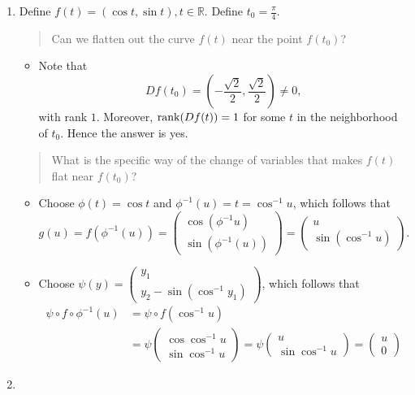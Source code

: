 \begin{example}
\begin{enumerate}
\item
Define $f(t)=(\cos t,\sin t), t\in\mathbb{R}$. Define $t_0=\frac{\pi}{4}$. 
\begin{quotation}
Can we flatten out the curve $f(t)$ near the point $f(t_0)$?
\end{quotation} 
\begin{itemize}
\item
Note that
\[
Df(t_0)=(-\frac{\sqrt{2}}{2},\frac{\sqrt{2}}{2})\ne0,
\]
with rank $1$. Moreover, $\operatorname{rank}(Df(t))=1$ for some $t$ in the neighborhood of $t_0$. Hence the answer is yes.
\end{itemize}
\begin{quotation}
What is the specific way of the change of variables that makes $f(t)$ flat near $f(t_0)$?
\end{quotation}
\begin{itemize}
\item
Choose $\phi(t)=\cos t$ and $\phi^{-1}(u)=t=\cos^{-1}u$, which follows that
\[
g(u)=f(\phi^{-1}(u))=\begin{pmatrix}
\cos(\phi^{-1}u)\\\sin(\phi^{-1}(u))
\end{pmatrix}
=\begin{pmatrix}
u\\
\sin(\cos^{-1}u)
\end{pmatrix}.
\]
\item
Choose $\psi(y)=\begin{pmatrix}
y_1\\y_2-\sin(\cos^{-1}y_1)
\end{pmatrix}$, which follows that
\begin{align*}
\psi\circ f\circ\phi^{-1}(u)
&=
\psi\circ f(\cos^{-1}u)\\
&=\psi\begin{pmatrix}
\cos\cos^{-1}u
\\
\sin\cos^{-1}u
\end{pmatrix}=
\psi\begin{pmatrix}
u
\\
\sin\cos^{-1}u
\end{pmatrix}
=\begin{pmatrix}
u\\0
\end{pmatrix}
\end{align*}
\end{itemize}
\item

\end{enumerate}
\end{example}
